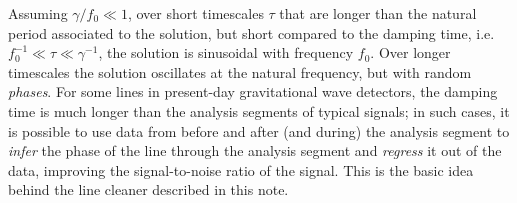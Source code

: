 \documentclass[modern]{aastex631}
\begin{document}
Assuming $\gamma / f_0 \ll 1$, over short timescales $\tau$ that are longer than
the natural period associated to the solution, but short compared to the damping
time, i.e.\ $f_0^{-1} \ll \tau \ll \gamma^{-1}$, the solution is sinusoidal with
frequency $f_0$.  Over longer timescales the solution oscillates at the natural
frequency, but with random \emph{phases}. For some lines in present-day
gravitational wave detectors, the damping time is much longer than the analysis
segments of typical signals; in such cases, it is possible to use data from
before and after (and during) the analysis segment to \emph{infer} the phase of
the line through the analysis segment and \emph{regress} it out of the data,
improving the signal-to-noise ratio of the signal.  This is the basic idea
behind the line cleaner described in this note.
\end{document}
